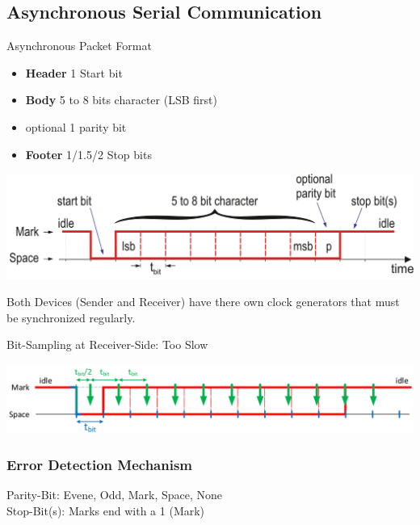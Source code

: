 \subsection{Asynchronous Serial Communication }
Asynchronous Packet Format \\
\begin{itemize}
	\itemsep-.5em 
	\item \textbf{Header} 1 Start bit
	\item \textbf{Body} 5 to 8 bits character (LSB first)
	\item optional 1 parity bit
	\item \textbf{Footer} 1/1.5/2 Stop bits
\end{itemize}
\includegraphics[width=\columnwidth]{"Images/async_package_format.png"}

Both Devices (Sender and Receiver) have there own clock generators that must be synchronized regularly.

Bit-Sampling at Receiver-Side: Too Slow
\begin{center}
	\includegraphics[width=.9\columnwidth]{"Images/bit_smapling.png"}
\end{center}


\subsubsection{Error Detection Mechanism}
Parity-Bit: Evene, Odd, Mark, Space, None\\
Stop-Bit(s): Marks end with a 1 (Mark)








